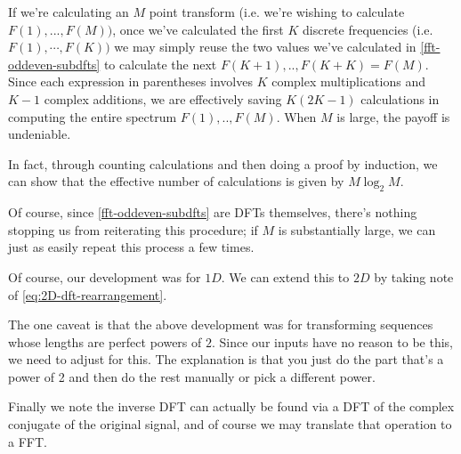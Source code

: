 If we're calculating an $M$ point transform
(i.e. we're wishing to
calculate $F(1), ... , F(M))$, once we've calculated the first $K$ discrete frequencies (i.e. $F(1), \cdots , F(K))$ we may simply reuse the two values we've calculated in \cref{fft-oddeven-subdfts} to calculate the next $F(K+1),..,F(K+K) = F(M)$. Since each expression in parentheses involves $K$ complex multiplications and $K-1$ complex additions, we are effectively saving $K(2K-1)$ calculations in computing the entire spectrum  $F(1), ..,  F(M)$. When $M$ is large, the payoff is undeniable.

In fact, through counting calculations and then doing a proof by induction, we can show that the effective number of calculations is given by $M\log_2{M}$. %

Of course, since \cref{fft-oddeven-subdfts} are DFTs themselves, there's nothing stopping us from reiterating this procedure; if $M$ is substantially large, we can just as easily repeat this process a few times.

Of course, our development was for $1D$.  We can extend this to $2D$ by taking note of \cref{eq:2D-dft-rearrangement}.

The one caveat is that the above development was for transforming sequences whose lengths are perfect powers of $2$. Since our inputs have no reason to be this, we need to adjust for this. The explanation is that you just do the part that's a power of 2 and  then do the rest manually or pick a different power.

Finally we note the inverse DFT can actually be found via a DFT of the complex conjugate of the original signal, and of course we may translate that operation to a FFT. %


